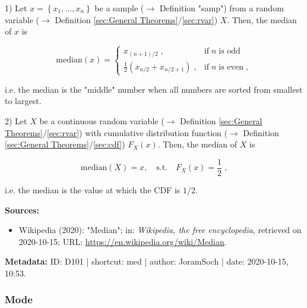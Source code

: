 \documentclass[a4paper,12pt,twoside]{book}
\begin{document}
\vspace{1em}
1) Let $x = \left\lbrace x_1, \ldots, x_n \right\rbrace$ be a sample ($\rightarrow$ Definition "samp") from a random variable ($\rightarrow$ Definition \ref{sec:General Theorems}/\ref{sec:rvar}) $X$. Then, the median of $x$ is

\begin{equation} \label{eq:med-med-samp}
\mathrm{median}(x) = \left\{
\begin{array}{cl}
x_{(n+1)/2} \; , & \text{if} \; n \; \text{is odd} \\
\frac{1}{2}(x_{n/2} + x_{n/2+1}) \; , & \text{if} \; n \; \text{is even} \; ,
\end{array}
\right.
\end{equation}

i.e. the median is the "middle" number when all numbers are sorted from smallest to largest.

\vspace{1em}
2) Let $X$ be a continuous random variable ($\rightarrow$ Definition \ref{sec:General Theorems}/\ref{sec:rvar}) with cumulative distribution function ($\rightarrow$ Definition \ref{sec:General Theorems}/\ref{sec:cdf}) $F_X(x)$. Then, the median of $X$ is

\begin{equation} \label{eq:med-med-rvar}
\mathrm{median}(X) = x, \quad \mathrm{s.t.} \quad F_X(x) = \frac{1}{2} \; ,
\end{equation}

i.e. the median is the value at which the CDF is $1/2$.


\vspace{1em}
\textbf{Sources:}
\begin{itemize}
\item Wikipedia (2020): "Median"; in: \textit{Wikipedia, the free encyclopedia}, retrieved on 2020-10-15; URL: \url{https://en.wikipedia.org/wiki/Median}.
\end{itemize}


\vspace{1em}
\textbf{Metadata:} ID: D101 | shortcut: med | author: JoramSoch | date: 2020-10-15, 10:53.
\vspace{1em}



\subsubsection[\textit{Mode}]{Mode} \label{sec:mode}
\setcounter{equation}{0}
\end{document}
